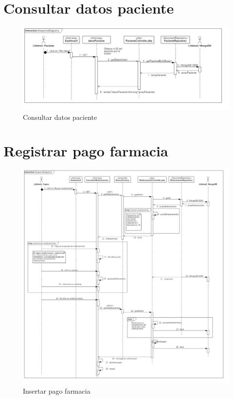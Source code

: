 \section{Consultar datos paciente}
\begin{figure}[htbp!]
		\centering
			\includegraphics[width=1\textwidth]{uml/DiagramasSecuencia/Trujillo/getDatosPaciente}
		\caption{Consultar datos paciente}
	\end{figure}
	\newpage
\section{Registrar pago farmacia}
\begin{figure}[htbp!]
		\centering
			\includegraphics[width=1\textwidth]{uml/DiagramasSecuencia/Trujillo/insertPagoMedicina}
		\caption{Insertar pago farmacia}
	\end{figure}
	\newpage
